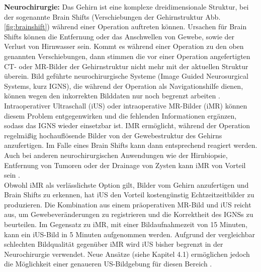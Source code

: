 \textbf{Neurochirurgie:}
Das Gehirn ist eine komplexe dreidimensionale Struktur, bei der sogenannte Brain Shifts (Verschiebungen der Gehirnstruktur Abb. \ref{fig:brainshift}) während einer Operation auftreten können. Ursachen für Brain Shifts können die Entfernung oder das Anschwellen von Gewebe, sowie der Verlust von Hirnwasser sein. Kommt es während einer Operation zu den oben genannten Verschiebungen, dann stimmen die vor einer Operation angefertigten CT- oder MR-Bilder der Gehirnstruktur nicht mehr mit der aktuellen Struktur überein. Bild geführte neurochirurgische Systeme (Image Guided Neurosurgical Systems, kurz IGNS), die während der Operation als Navigationshilfe dienen, können wegen den inkorrekten Bilddaten nur noch begrenzt arbeiten \cite{BrainShiftInTumorResection}.\\
Intraoperativer Ultraschall (iUS) oder intraoperative MR-Bilder (iMR) können diesem Problem entgegenwirken und die fehlenden Informationen ergänzen, sodass das IGNS wieder einsetzbar ist. IMR ermöglicht, während der Operation regelmäßig hochauflösende Bilder von der Gewebestruktur des Gehirns anzufertigen. Im Falle eines Brain Shifts kann dann entsprechend reagiert werden. Auch bei anderen neurochirurgischen Anwendungen wie der Hirnbiopsie, Entfernung von Tumoren oder der Drainage von Zysten kann iMR von Vorteil sein \cite{BrainShiftInTumorResection}.\\
Obwohl iMR als verlässlichste Option gilt, Bilder vom Gehirn anzufertigen und Brain Shifts zu erkennen, hat iUS den Vorteil kostengünstig Echtzeitzeitbilder zu produzieren. Die Kombination aus einem präoperativen MR-Bild und iUS reicht aus, um Gewebeveränderungen zu registrieren und die Korrektheit des IGNSs zu beurteilen. Im Gegensatz zu iMR, mit einer Bildaufnahmezeit von 15 Minuten, kann ein iUS-Bild in 5 Minuten aufgenommen werden. Aufgrund der vergleichbar schlechten Bildqualität gegenüber iMR wird iUS bisher begrenzt in der Neurochirurgie verwendet. Neue Ansätze (siehe Kapitel 4.1) ermöglichen jedoch die Möglichkeit einer genaueren US-Bildgebung für diesen Bereich \cite{BrainShiftInTumorResection}.

